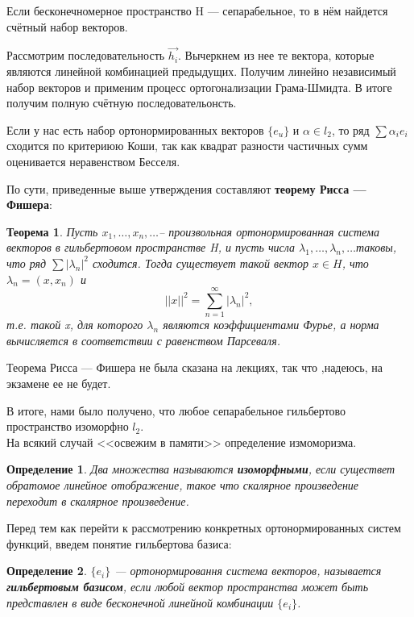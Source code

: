 \documentclass[12pt]{article}
\newtheorem{defi}{Определение}[section]
\newtheorem{theorem}{Теорема}[section] %
\begin{document}
	Если бесконечномерное пространство H --- сепарабельное, то в нём найдется счётный набор векторов.
	
	Рассмотрим последовательность $\vec{h_i}$. Вычеркнем из нее те вектора, которые являются линейной комбинацией предыдущих.
	Получим линейно независимый набор векторов и применим процесс ортогонализации Грама-Шмидта. В итоге получим полную счётную 
	последовательонсть.
	
	Если у нас есть набор ортонормированных векторов $\{ e_u \}$ и $\alpha \in l_2$, то ряд $\sum \alpha_i e_i$ сходится по 
	критериюю Коши, так как квадрат разности частичных сумм оценивается неравенством Бесселя.
	
	По сути, приведенные выше утверждения составляют \textbf{теорему Рисса --- Фишера}:
	\begin{theorem}
		Пусть $x_1, \dots ,x_n, \dots $-- произвольная ортонормированная система векторов в гильбертовом пространстве H, и пусть 
		числа $\lambda _1, \dots ,\lambda _n, \dots $таковы, что ряд $\sum |\lambda_n|^2$ сходится. Тогда существует такой 
		вектор $x\in H$, что $\lambda _n=(x,x_n)$ и
		\begin{displaymath}
			\vert\vert x\vert\vert ^2=\sum_{n=1}^{\infty } \vert\lambda _n\vert^2,
		\end{displaymath}
		т.е. такой x, для которого $\lambda _n$ являются коэффициентами Фурье, а норма вычисляется в 
		соответствии с равенством Парсеваля. 
	\end{theorem}
	{\color{red} Теорема Рисса --- Фишера не была сказана на лекциях, так что ,надеюсь, на экзамене ее не будет.}
	
	В итоге, нами было получено, что любое сепарабельное гильбертово пространство изоморфно $l_2$. \\
	На всякий случай <<освежим в памяти>> определение измоморизма.
	\begin{defi}
		Два множества называются \textbf{изоморфными}, если существет обратомое линейное отображение, такое что скалярное
		произведение переходит в скалярное произведение.
	\end{defi}
	
	Перед тем как перейти к рассмотрению конкретных ортонормированных систем функций, введем понятие гильбертова базиса:
	\begin{defi}
		$\{ e_i \}$ --- ортонормировання система векторов, называется \textbf{гильбертовым базисом}, если любой вектор
		пространства может быть представлен в виде бесконечной линейной комбинации $ \{ e_i \} $.
	\end{defi}
	
\end{document}
